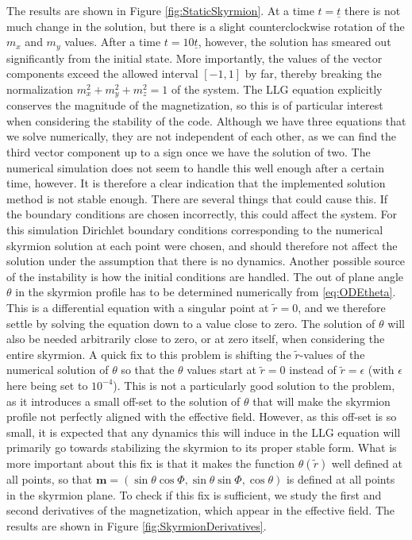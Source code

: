 The results are shown in Figure \ref{fig:StaticSkyrmion}. At a time $t=\underline{t}$ there is not much change in the solution, but there is a slight counterclockwise rotation of the $m_x$ and $m_y$ values. After a time $t=10\underline{t}$, however, the solution has smeared out significantly from the initial state. More importantly, the values of the vector components exceed the allowed interval $\left[-1,1\right]$ by far, thereby breaking the normalization $m_x^2+m_y^2+m_z^2=1$ of the system. The LLG equation explicitly conserves the magnitude of the magnetization, so this is of particular interest when considering the stability of the code. Although we have three equations that we solve numerically, they are not independent of each other, as we can find the third vector component up to a sign once we have the solution of two. The numerical simulation does not seem to handle this well enough after a certain time, however. It is therefore a clear indication that the implemented solution method is not stable enough. There are several things that could cause this. If the boundary conditions are chosen incorrectly, this could affect the system. For this simulation Dirichlet boundary conditions corresponding to the numerical skyrmion solution at each point were chosen, and should therefore not affect the solution under the assumption that there is no dynamics. Another possible source of the instability is how the initial conditions are handled. The out of plane angle $\theta$ in the skyrmion profile has to be determined numerically from \eqref{eq:ODEtheta}. This is a differential equation with a singular point at $\tilde{r} = 0$, and we therefore settle by solving the equation down to a value close to zero. The solution of $\theta$ will also be needed arbitrarily close to zero, or at zero itself, when considering the entire skyrmion. A quick fix to this problem is shifting the $\tilde{r}$-values of the numerical solution of $\theta$ so that the $\theta$ values start at $\tilde{r}=0$ instead of $\tilde{r}=\epsilon$ (with $\epsilon$ here being set to $10^{-4}$). This is not a particularly good solution to the problem, as it introduces a small off-set to the solution of $\theta$ that will make the skyrmion profile not perfectly aligned with the effective field. However, as this off-set is so small, it is expected that any dynamics this will induce in the LLG equation will primarily go towards stabilizing the skyrmion to its proper stable form. What is more important about this fix is that it makes the function $\theta(\tilde{r})$ well defined at all points, so that $\mathbold{m} = \left(\sin\theta\cos\Phi,\sin\theta\sin\Phi,\cos\theta\right)$ is defined at all points in the skyrmion plane. To check if this fix is sufficient, we study the first and second derivatives of the magnetization, which appear in the effective field. The results are shown in Figure \ref{fig:SkyrmionDerivatives}.
